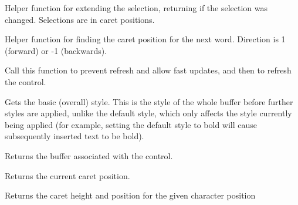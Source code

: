 
Helper function for extending the selection, returning \true if the selection was
changed. Selections are in caret positions.

\label{wxrichtextctrlfindnextwordposition}


Helper function for finding the caret position for the next word. Direction
is 1 (forward) or -1 (backwards).

\label{wxrichtextctrlfreeze}


Call this function to prevent refresh and allow fast updates, and then  to
refresh the control.

\label{wxrichtextctrlgetbasicstyle}


Gets the basic (overall) style. This is the style of the whole
buffer before further styles are applied, unlike the default style, which
only affects the style currently being applied (for example, setting the default
style to bold will cause subsequently inserted text to be bold).

\label{wxrichtextctrlgetbuffer}



Returns the buffer associated with the control.

\label{wxrichtextctrlgetcaretposition}


Returns the current caret position.

\label{wxrichtextctrlgetcaretpositionforindex}


Returns the caret height and position for the given character position

